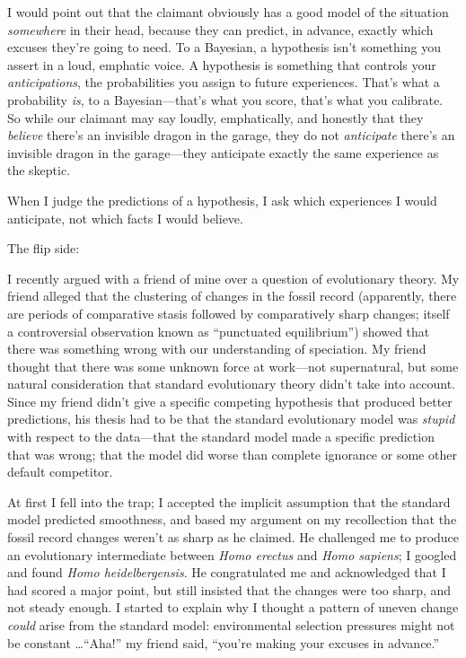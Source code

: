 {
 I would point out that the claimant obviously has a good model of
the situation \textit{somewhere} in their head, because they can
predict, in advance, exactly which excuses they're
going to need. To a Bayesian, a hypothesis isn't
something you assert in a loud, emphatic voice. A hypothesis is
something that controls your \textit{anticipations}, the probabilities
you assign to future experiences. That's what a
probability \textit{is}, to a Bayesian---that's what
you score, that's what you calibrate. So while our
claimant may say loudly, emphatically, and honestly that they
\textit{believe} there's an invisible dragon in the
garage, they do not \textit{anticipate} there's an
invisible dragon in the garage---they anticipate exactly the same
experience as the skeptic.}

{
 When I judge the predictions of a hypothesis, I ask which
experiences I would anticipate, not which facts I would believe.}

{
 The flip side:}

{
 I recently argued with a friend of mine over a question of
evolutionary theory. My friend alleged that the clustering of changes
in the fossil record (apparently, there are periods of comparative
stasis followed by comparatively sharp changes; itself a controversial
observation known as ``punctuated
equilibrium'') showed that there was something wrong
with our understanding of speciation. My friend thought that there was
some unknown force at work---not supernatural, but some natural
consideration that standard evolutionary theory didn't
take into account. Since my friend didn't give a
specific competing hypothesis that produced better predictions, his
thesis had to be that the standard evolutionary model was
\textit{stupid} with respect to the data---that the standard model made
a specific prediction that was wrong; that the model did worse than
complete ignorance or some other default competitor.}

{
 At first I fell into the trap; I accepted the implicit assumption
that the standard model predicted smoothness, and based my argument on
my recollection that the fossil record changes weren't
as sharp as he claimed. He challenged me to produce an evolutionary
intermediate between \textit{Homo erectus} and \textit{Homo sapiens}; I
googled and found \textit{Homo heidelbergensis}. He congratulated me
and acknowledged that I had scored a major point, but still insisted
that the changes were too sharp, and not steady enough. I started to
explain why I thought a pattern of uneven change \textit{could} arise
from the standard model: environmental selection pressures might not be
constant \ldots ``Aha!'' my friend
said, ``you're making your excuses in
advance.''}

